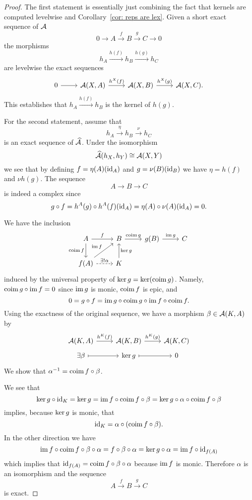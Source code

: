 \documentclass[reqno, 12pt]{amsart}
\begin{document}
\begin{proof}
  The first statement is essentially just combining the fact that kernels are computed levelwise and Corollary~\ref{cor: reps are lex}.
  Given a short exact sequence of $\mathcal{A}$
  $$0 \to A \overset{f}\to B \overset{g}\to C \to 0$$
  the morphisms 
  $$h_A \overset{h(f)} \to h_B \overset{h(g)}\to h_C$$
  are levelwise the exact sequences
  $$\begin{tikzcd}
    0 \arrow{r} & \A(X,A) \arrow{r}{h^X(f)} & \A(X,B) \arrow{r}{h^X(g)} & \A(X,C).
  \end{tikzcd}$$
  This establishes that $h_A \overset{h(f)}\to h_B$ is the kernel of $h(g)$.

  For the second statement, assume that
  $$h_A \overset{\eta} \to h_B \overset{\nu}\to h_C$$
  is an exact sequence of $\widehat{\mathcal{A}}$.
  Under the isomorphism
  $$\widehat{\mathcal{A}}(h_X, h_Y) \cong \mathcal{A}(X,Y)$$
  we see that by defining $f = \eta(A)(\operatorname{id}_A)$ and $g = \nu(B)(\operatorname{id}_B)$ we have $\eta = h(f)$ and $\nu h(g)$.
  The sequence
  $$A \to B \to C$$
  is indeed a complex since
  $$g \circ f = h^A(g) \circ h^A(f)(\operatorname{id}_A) = \eta(A) \circ \nu(A)(\operatorname{id}_A) = 0.$$

  We have the inclusion
  $$\begin{tikzcd}
    A \arrow{r}{f}\arrow{d}[swap]{\op{coim}f} & B \arrow{r}{\op{coim} g} & g(B) \arrow{r}{\op{im}g} & C\\
    f(A) \arrow{ur}{\op{im} f}\arrow[dashed]{r}{\exists !\alpha} & K \arrow[swap]{u}{\op{ker} g}
  \end{tikzcd}$$
  induced by the universal property of $\operatorname{ker} g = \operatorname{ker}(\operatorname{coim} g)$.
  Namely, $\operatorname{coim} g \circ \operatorname{im} f = 0$ since $\operatorname{im} g$ is monic, $\operatorname{coim} f$ is epic, and
  $$0 = g \circ f = \operatorname{im}g \circ \operatorname{coim} g \circ \operatorname{im} f \circ \operatorname{coim} f.$$
  Using the exactness of the original sequence, we have a morphism $\beta \in \mathcal{A}(K,A)$ by
  $$\begin{tikzcd}[row sep=tiny]
    \A(K,A) \arrow{r}{h^K(f)} & \A(K,B) \arrow{r}{h^K(g)} & \A(K,C)\\
    \exists \beta \arrow[mapsto]{r} & \op{ker} g \arrow[mapsto]{r} & 0
  \end{tikzcd}$$
  We show that $\alpha^{-1} = \operatorname{coim} f \circ \beta$.

  We see that
  $$\operatorname{ker} g \circ \operatorname{id}_K
  = \operatorname{ker} g
  = \operatorname{im} f \circ \operatorname{coim} f \circ \beta
  = \operatorname{ker} g \circ \alpha \circ \operatorname{coim} f \circ \beta$$
  implies, because $\operatorname{ker} g$ is monic, that
  $$\operatorname{id}_K = \alpha \circ (\operatorname{coim} f \circ \beta).$$
  In the other direction we have
  $$\operatorname{im} f \circ \operatorname{coim} f \circ \beta \circ \alpha = f \circ \beta \circ \alpha = \operatorname{ker} g \circ \alpha = \operatorname{im} f \circ \operatorname{id}_{f(A)}$$
  which implies that $\operatorname{id}_{f(A)} = \operatorname{coim} f \circ \beta \circ \alpha$ because $\operatorname{im} f$ is monic.
  Therefore $\alpha$ is an isomorphism and the sequence
  $$A \overset{f}\to B \overset{g}\to C$$
  is exact.
\end{proof}
\end{document}
